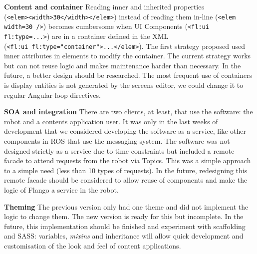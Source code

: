 \textbf{Content and container} Reading inner and inherited properties \\(\lstinline$<elem><width>30</width></elem>$) instead of reading them in-line (\lstinline$<elem width=30 />$) becomes cumbersome when UI Components (\lstinline$<fl:ui fl:type=...>$) are in a container defined in the \ac{XML} \\(\lstinline$<fl:ui fl:type="container">...</elem>$).
The first strategy proposed used inner attributes in elements to modify the container.
The current strategy works but can not reuse logic and makes maintenance harder than necessary.
In the future, a better design should be researched.
The most frequent use of containers is display entities is not generated by the screens editor, we could change it to regular Angular loop directives.

\textbf{SOA and integration} There are two clients, at least, that use the software: the robot and a contents application user.
It was only in the last weeks of development that we considered developing the software as a service, like other components in \ac{ROS} that use the messaging system.
The software was not designed strictly as a service due to time constraints but included a remote facade to attend requests from the robot via Topics.
This was a simple approach to a simple need (less than 10 types of requests).
In the future, redesigning this remote facade should be considered to allow reuse of components and make the logic of Flango \cm a service in the robot.

\textbf{Theming} The previous version only had one theme and did not implement the logic to change them.
The new version is ready for this but incomplete.
In the future, this implementation should be finished and experiment with scaffolding and \ac{SASS}: variables, \textit{mixins} and inheritance will allow quick development and customisation of the look and feel of content applications.
